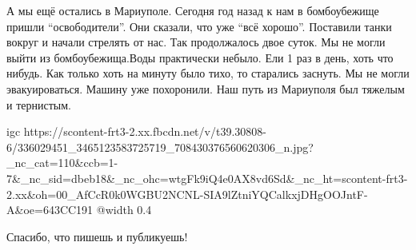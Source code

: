  
 
 
 
 

\qqSecCmt


А мы ещё остались в Мариуполе. Сегодня год назад к нам в бомбоубежище пришли
\enquote{освободители}. Они сказали, что уже \enquote{всё хорошо}. Поставили танки вокруг и
начали стрелять от нас. Так продолжалось двое суток. Мы не могли выйти из
бомбоубежища.Воды практически небыло. Ели 1 раз в день, хоть что нибудь. Как
только хоть на минуту было тихо, то старались заснуть. Мы не могли
эвакуироваться. Машину уже похоронили. Наш путь из Мариуполя был тяжелым и
тернистым.

\ifcmt
  igc https://scontent-frt3-2.xx.fbcdn.net/v/t39.30808-6/336029451_3465123583725719_708430376560620306_n.jpg?_nc_cat=110&ccb=1-7&_nc_sid=dbeb18&_nc_ohc=wtgFk9iQ4e0AX8vd6Sd&_nc_ht=scontent-frt3-2.xx&oh=00_AfCcR0k0WGBU2NCNL-SIA9lZtniYQCalkxjDHgOOJntF-A&oe=643CC191
	@width 0.4
\fi


Спасибо, что пишешь и публикуешь!
